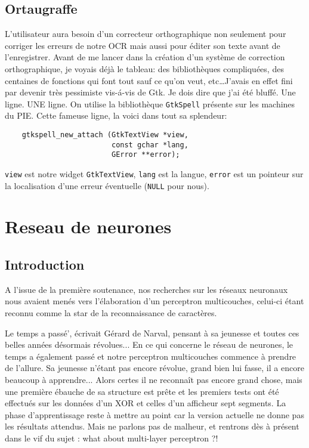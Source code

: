 \documentclass[a4paper,10pt]{report}
\begin{document}
	\section{Ortaugraffe} %
	\label{sec:ortaugraffe}
		L'utilisateur aura besoin d'un correcteur orthographique non seulement pour corriger les erreurs de notre OCR mais aussi pour \'editer son texte avant de l'enregistrer. Avant de me lancer dans la cr\'eation d'un syst\`eme de correction orthographique, je voyais d\'ej\`a le tableau: des biblioth\`eques compliqu\'ees, des centaines de fonctions qui font tout sauf ce qu'on veut, etc\ldots J'avais en effet fini par devenir tr\`es pessimiste vis-\'a-vis de Gtk. Je dois dire que j'ai \'et\'e bluff\'e. Une ligne. UNE ligne. On utilise la biblioth\`eque \verb!GtkSpell! pr\'esente sur les machines du PIE. Cette fameuse ligne, la voici dans tout sa splendeur:
		\begin{lstlisting}
    gtkspell_new_attach (GtkTextView *view,
                         const gchar *lang,
                         GError **error);
		\end{lstlisting}
		\verb!view! est notre widget \verb!GtkTextView!, \verb!lang! est la langue, \verb!error! est un pointeur sur la localisation d'une erreur \'eventuelle (\verb!NULL! pour nous).




\chapter{Reseau de neurones} %
\label{cha:reseau_de_neurones}

\section{Introduction} %
\label{subsec:introduction}
A l'issue de la premi\`ere soutenance, nos recherches sur les r\'eseaux
neuronaux nous avaient men\'es vers l'\'elaboration d'un perceptron
multicouches, celui-ci \'etant reconnu comme la star de la
reconnaissance de caract\`eres.

Le temps a pass\'e', \'ecrivait G\'erard de Narval, pensant \`a sa jeunesse
et toutes ces belles ann\'ees d\'esormais r\'evolues... En ce qui
concerne le r\'eseau de neurones, le temps a \'egalement pass\'e et
notre perceptron multicouches commence \`a prendre de l'allure. Sa
jeunesse n'\'etant pas encore r\'evolue, grand bien lui fasse, il a
encore beaucoup \`a apprendre... Alors
certes il ne reconna\^it pas encore grand chose, mais une premi\`ere
\'ebauche de sa structure est pr\^ete et les premiers tests ont \'et\'e
effectu\'es sur les donn\'ees d'un XOR et celles d'un afficheur sept
segments. La phase d'apprentissage reste \`a mettre au point car la
version actuelle ne donne pas les r\'esultats attendus. Mais ne parlons
pas de malheur, et rentrons d\`es \`a pr\'esent dans le vif du sujet : what about
multi-layer perceptron ?! 
\end{document}
